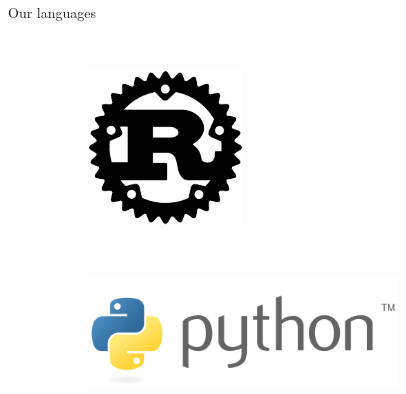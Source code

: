 \documentclass[NET,english,aspectratio=43,notitleframe]{tumbeamer}
\begin{document}
\begin{frame}{Our languages}
\begin{figure}
\begin{subfigure}[t]{0.2\columnwidth}
    \end{subfigure}
    ~ 
    \begin{subfigure}[t]{0.2\columnwidth}
        \centering
        \includegraphics[width=0.45\textwidth]{pics/rust}
    \end{subfigure}
    ~ 
    \begin{subfigure}[t]{0.3\columnwidth}
	\centering
        \includegraphics[width=0.9\textwidth]{pics/python}
    \end{subfigure}
\end{figure}
\end{frame}
\end{document}
